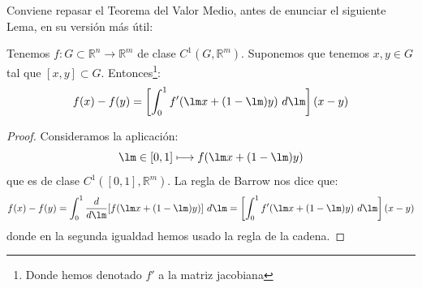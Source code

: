 \noindent
Conviene repasar el Teorema del Valor Medio, antes de enunciar el siguiente Lema, en su versión más útil:
\begin{teo}
Tenemos $f:G\subset\mathbb{R}^n\to\mathbb{R}^m$ de clase $C^1(G,\mathbb{R}^m)$. Suponemos que tenemos $x,y\in G$ tal que $[x,y]\subset G$. Entonces\footnote{Donde hemos denotado $f'$ a la matriz jacobiana}:
\begin{equation*}
    f(x) - f(y) = \left[\int_{0}^{1} f'(\lm x +(1-\lm)y)~d\lm \right](x-y)
\end{equation*}
\begin{proof}
    Consideramos la aplicación:
    \begin{equation*}
        \lm\in [0,1]\longmapsto f(\lm x + (1-\lm)y)
    \end{equation*}
    que es de clase $C^1([0,1],\mathbb{R}^m)$. La regla de Barrow nos dice que:
    \begin{equation*}
        f(x) - f(y) = \int_{0}^{1} \frac{d}{d\lm}[f(\lm x + (1-\lm)y)]~d\lm = \left[\int_{0}^{1} f'(\lm x + (1-\lm)y)~d\lm\right] (x-y)
    \end{equation*}
    donde en la segunda igualdad hemos usado la regla de la cadena.
\end{proof}
\end{teo}

